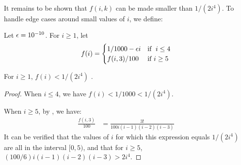 It remains to be shown that $f(i, k)$ can be made smaller than $1/(2i^4)$. To handle edge cases around small values of $i$, we define:
\begin{definition}
    \label{def:tie-breaker-term}
    Let ${\epsilon} = 10^{-10}$.
    For $i \geq 1$, let
    \[
        f(i) =
            \begin{cases}
                1/1000 - {\epsilon} i & \text{if\ } \;i \leq 4 \\
                f(i, 3) / 100 & \text{if\ } i \geq 5
            \end{cases}
    \]
\end{definition}

\begin{lemma}
    \label{lem:tie-breaker-is-small}
    For $i \geq 1$, $f(i) < 1/(2i^4)$ .
\end{lemma}
\begin{proof}
    When $i \leq 4$, we have $f(i) < 1/1000 < 1/(2i^4)$.
    
    When $i \geq 5$, by , we have:
    \begin{align*}
        \frac{f(i, 3)}{100} & = \frac{3!}{100 i (i-1) (i-2) (i-3)}
    \end{align*}
    It can be verified that the values of $i$ for which this expression equals $1/(2i^4)$ are all in the interval $[0, 5)$, and that for $i \geq 5$, $(100/6)i (i-1) (i-2) (i-3) > 2i^4$.
\end{proof}